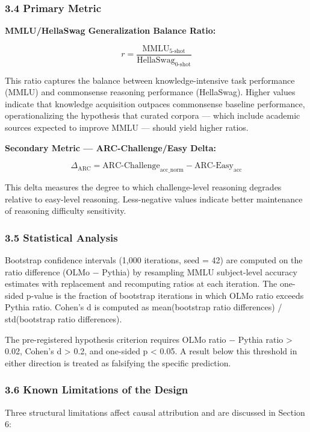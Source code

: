 \subsubsection{3.4 Primary Metric}

\textbf{MMLU/HellaSwag Generalization Balance Ratio:}

$$r = \frac{\text{MMLU}_{5\text{-shot}}}{\text{HellaSwag}_{0\text{-shot}}}$$

This ratio captures the balance between knowledge-intensive task performance (MMLU) and commonsense reasoning performance (HellaSwag). Higher values indicate that knowledge acquisition outpaces commonsense baseline performance, operationalizing the hypothesis that curated corpora --- which include academic sources expected to improve MMLU --- should yield higher ratios.

\textbf{Secondary Metric --- ARC-Challenge/Easy Delta:}

$$\Delta_{\text{ARC}} = \text{ARC-Challenge}_{\text{acc\_norm}} - \text{ARC-Easy}_{\text{acc}}$$

This delta measures the degree to which challenge-level reasoning degrades relative to easy-level reasoning. Less-negative values indicate better maintenance of reasoning difficulty sensitivity.

\subsubsection{3.5 Statistical Analysis}

Bootstrap confidence intervals (1,000 iterations, seed = 42) are computed on the ratio difference (OLMo $-$ Pythia) by resampling MMLU subject-level accuracy estimates with replacement and recomputing ratios at each iteration. The one-sided p-value is the fraction of bootstrap iterations in which OLMo ratio exceeds Pythia ratio. Cohen's d is computed as mean(bootstrap ratio differences) / std(bootstrap ratio differences).

The pre-registered hypothesis criterion requires OLMo ratio $-$ Pythia ratio > 0.02, Cohen's d > 0.2, and one-sided p < 0.05. A result below this threshold in either direction is treated as falsifying the specific prediction.

\subsubsection{3.6 Known Limitations of the Design}

Three structural limitations affect causal attribution and are discussed in Section 6:

